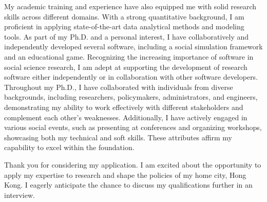 \documentclass[11pt, a4paper]{awesome-cv}
\begin{document}
\begin{cvletter}
My academic training and experience have also equipped me with solid research skills across different domains. With a strong quantitative background, I am proficient in applying state-of-the-art data analytical methods and modeling tools. As part of my Ph.D. and a personal interest, I have collaboratively and independently developed several software, including a social simulation framework and an educational game. Recognizing the increasing importance of software in social science research, I am adept at supporting the development of research software either independently or in collaboration with other software developers. Throughout my Ph.D., I have collaborated with individuals from diverse backgrounds, including researchers, policymakers, administrators, and engineers, demonstrating my ability to work effectively with different stakeholders and complement each other's weaknesses. Additionally, I have actively engaged in various social events, such as presenting at conferences and organizing workshops, showcasing both my technical and soft skills. These attributes affirm my capability to excel within the foundation.

Thank you for considering my application. I am excited about the opportunity to apply my expertise to research and shape the policies of my home city, Hong Kong. I eagerly anticipate the chance to discuss my qualifications further in an interview.


\end{cvletter}


\makeletterclosing
\end{document}
